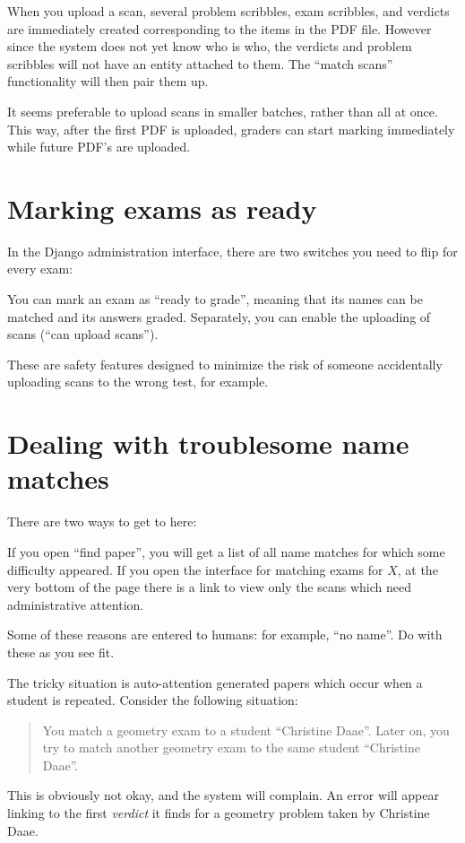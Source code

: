 When you upload a scan,
several problem scribbles, exam scribbles, and verdicts
are immediately created corresponding to the items in the PDF file.
However since the system does not yet know who is who,
the verdicts and problem scribbles will not have an entity attached to them.
The ``match scans'' functionality will then pair them up.

It seems preferable to upload scans in smaller batches,
rather than all at once.
This way, after the first PDF is uploaded,
graders can start marking immediately
while future PDF's are uploaded.

\section{Marking exams as ready}
In the Django administration interface,
there are two switches you need to flip for every exam:
\begin{itemize}
	\ii You can mark an exam as ``ready to grade'',
	meaning that its names can be matched and its answers graded.
	\ii Separately, you can enable the uploading of scans
	(``can upload scans'').
\end{itemize}
These are safety features designed to minimize the risk
of someone accidentally uploading scans to the wrong test, for example.

\section{Dealing with troublesome name matches}
There are two ways to get to here:
\begin{itemize}
	\ii If you open ``find paper'', you will get a list of all name matches
	for which some difficulty appeared.
	\ii If you open the interface for matching exams for $X$,
	at the very bottom of the page there is a link
	to view only the scans which need administrative attention.
\end{itemize}

Some of these reasons are entered to humans:
for example, ``no name''.
Do with these as you see fit.

The tricky situation is auto-attention generated papers
which occur when a student is repeated.
Consider the following situation:
\begin{quote}
	You match a geometry exam to a student ``Christine Daae''.  
	Later on, you try to match another geometry exam
	to the same student ``Christine Daae''.
\end{quote}
This is obviously not okay, and the system will complain.
An error will appear linking to the first \emph{verdict}
it finds for a geometry problem taken by Christine Daae.


